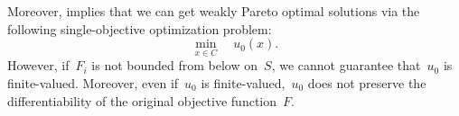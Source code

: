 \documentclass[../../main]{subfiles}
\begin{document}
Moreover,  implies that we can get weakly Pareto optimal solutions via the following single-objective optimization problem:
\begin{equation}
    \min_{x \in C} \quad u_0(x)
.\end{equation} 
However, if~$F_i$ is not bounded from below on~$S$, we cannot guarantee that~$u_0$ is finite-valued.
Moreover, even if~$u_0$ is finite-valued,~$u_0$ does not preserve the differentiability of the original objective function~$F$.
\end{document}
